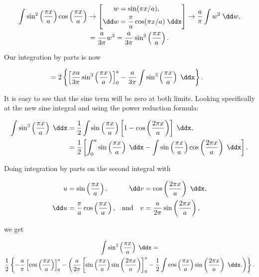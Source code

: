 \begin{gather*}
    \int \sin^2\left( \frac{\pi x}{a} \right)\cos\left( \frac{\pi x}{a} \right) 
    \rightarrow \left[
        \begin{alignedat}{1}
            w &= \sin(\pi x/a), \\
            \dd w &= \frac{\pi}{a}\cos(\pi x/a) \;\ddx
        \end{alignedat}
    \right] \rightarrow 
    \frac{a}{\pi}\int w^2 \;\dd w, \\
    = \frac{a}{3\pi}w^3 = \frac{a}{3\pi} \sin^3\left( \frac{\pi x}{a} \right).
\end{gather*}

Our integration by parts is now

\begin{align*}
    &= 2 \left\{ \left[ \frac{xa}{3\pi}\sin^3\left( \frac{\pi x}{a} \right) \right]_0^a - \frac{a}{3\pi}\int \sin^3\left( \frac{\pi x}{a} \right)\;\ddx \right\}.
\end{align*}

It is easy to see that the sine term will be zero at both limits. Looking specifically at the new sine integral and using the power reduction formula:

\begin{align*}
    \int \sin^3\left( \frac{\pi x}{a} \right)\;\ddx &= \frac{1}{2}\int\sin\left( \frac{\pi x}{a} \right) \left[ 1 - \cos\left( \frac{2\pi x}{a} \right) \right]\;\ddx, \\
    &= \frac{1}{2} \left[ \int_0^a \sin\left( \frac{\pi x}{a} \right)\;\ddx - \int \sin\left( \frac{\pi x}{a} \right)\cos\left( \frac{2\pi x}{a} \right)\;\ddx \right].
\end{align*}

Doing integration by parts on the second integral with

\begin{equation*}
    \begin{alignedat}{2}
        u &= \sin\left( \frac{\pi x}{a} \right), \quad & \quad \dd v &= \cos\left( \frac{2\pi x}{a} \right)\;\ddx, \\
        \dd u &= \frac{\pi}{a}\cos\left( \frac{\pi x}{a} \right), \quad &\mathrm{and} \quad v &= \frac{a}{2\pi}\sin\left( \frac{2\pi x}{a} \right),
    \end{alignedat}
\end{equation*}

we get

\begin{gather*}
    \int\sin^3\left( \frac{\pi x}{a} \right)\;\ddx = \\
    \frac{1}{2} \left\{ -\frac{a}{\pi} \left[\cos\left( \frac{\pi x}{a} \right)\right]_0^a - \left(\frac{a}{2\pi} \left[ \sin\left( \frac{\pi x}{a} \right)\sin\left( \frac{2\pi x}{a} \right) \right]_0^a - \frac{1}{2}\int\cos\left( \frac{\pi x}{a} \right)\sin\left( \frac{2\pi x}{a} \right)\;\ddx. \right) \right\}.
\end{gather*}

